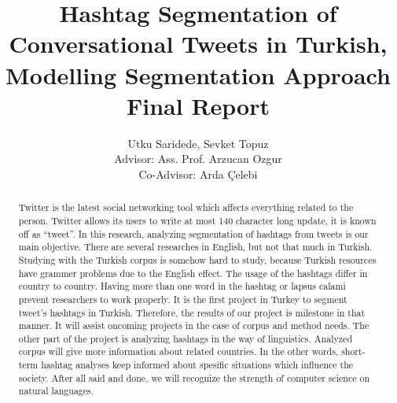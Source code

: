 \documentclass[12pt]{comjnl}
\begin{document}
\title[Hashtag Segmentation of Conversational Tweets in Turkish]{Hashtag Segmentation of Conversational Tweets in Turkish, Modelling Segmentation Approach Final Report}
\author{Utku Saridede, Sevket Topuz\\
Advisor: Ass. Prof. Arzucan Ozgur\\
Co-Advisor: Arda Çelebi}
 




\begin{abstract}	
Twitter is the latest social networking tool which affects everything related to the person.
Twitter allows its users to write at most 140 character long update, it is known off as 
``tweet''. In this research, analyzing segmentation of hashtags from tweets is our main objective. There are
several researches in English, but not that much in Turkish. Studying with the Turkish corpus is
somehow hard to study, because Turkish resources have grammer problems due to the English effect.
The usage of the hashtags differ in country to country. Having more than one word in the hashtag or lapsus calami 
prevent researchers to work properly. It is the first project in Turkey to segment tweet's hashtags in Turkish. Therefore, the results of our project is milestone in that manner. It will assist oncoming projects in the case of corpus and method needs. The other part of the project is analyzing hashtags in the way of linguistics.
Analyzed corpus will give more information about related countries. In the other words, short-term
hashtag analyses keep informed about spesific situations which influence the society. After all said
and done, we will recognize the strength of computer science on natural languages.
\end{abstract}

\maketitle
\onecolumn
\tableofcontents
\newpage
\end{document}
